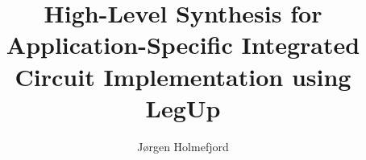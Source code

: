 \documentclass{MScthesisITEM}
\title{High-Level Synthesis for \newlinetitle Application-Specific Integrated Circuit \newlinetitle Implementation using LegUp} %
\author{Jørgen Holmefjord} %
\begin{document}

\pagestyle{plain}
\setlength{\parindent}{0pt}

\titleITEM


%

% 


%


\tableofcontents*







\newcommand{\specialcellr}[2][t]{%
  \begin{tabular}[#1]{@{}r@{}}#2\end{tabular}}
  \newcommand{\specialcelll}[2][t]{%
  \begin{tabular}[#1]{@{}l@{}}#2\end{tabular}}
\newcommand{\specialcell}[2][t]{%
  \begin{tabular}[#1]{@{}c@{}}#2\end{tabular}}

\lstset{language=LLVM,style=LLVMStyle}
\end{document}
